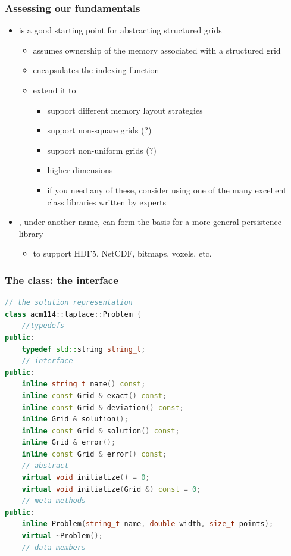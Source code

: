 \begin{frame}[fragile]
%
  \frametitle{Assessing our fundamentals}
%
  \begin{itemize}
%
  \item {} is a good starting point for abstracting structured grids
    \begin{itemize}
    \item assumes ownership of the memory associated with a structured grid
    \item encapsulates the indexing function
    \item extend it to
      \begin{itemize}
      \item support different memory layout strategies
      \item support non-square grids (?)
      \item support non-uniform grids (?)
      \item higher dimensions
      \item if you need any of these, consider using one of the many excellent class libraries
        written by experts
      \end{itemize}
    \end{itemize}
%
  \item {}, under another name, can form the basis for a more general
    persistence library
    \begin{itemize}
    \item to support HDF5, NetCDF, bitmaps, voxels, etc.
    \end{itemize}
%
  \end{itemize}
%
\end{frame}

\begin{frame}[fragile]
% 
  \frametitle{The  class: the interface}
%
  \begin{lstlisting}[language=c++,name=Problem]
// the solution representation
class acm114::laplace::Problem {
    //typedefs
public:
    typedef std::string string_t;
    // interface
public:
    inline string_t name() const;
    inline const Grid & exact() const;
    inline const Grid & deviation() const;
    inline Grid & solution();
    inline const Grid & solution() const;
    inline Grid & error();
    inline const Grid & error() const;
    // abstract
    virtual void initialize() = 0;
    virtual void initialize(Grid &) const = 0;
    // meta methods
public:
    inline Problem(string_t name, double width, size_t points);
    virtual ~Problem();
    // data members
  \end{lstlisting}
%
\end{frame}

